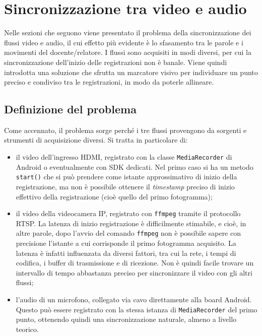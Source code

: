 \chapter{Sincronizzazione tra video e audio}
\label{cha:sync}

Nelle sezioni che seguono viene presentato il problema della sincronizzazione dei flussi video e audio, il cui effetto più evidente è lo sfasamento tra le parole e i movimenti del docente/relatore. I flussi sono acquisiti in modi diversi, per cui la sincronizzazione dell'inizio delle registrazioni non è banale. Viene quindi introdotta una soluzione che sfrutta un marcatore visivo per individuare un punto preciso e condiviso tra le registrazioni, in modo da poterle allineare.

\section{Definizione del problema}
\label{sec:sync_problema}

Come accennato, il problema sorge perché i tre flussi provengono da sorgenti e strumenti di acquisizione diversi. Si tratta in particolare di:

\begin{itemize}
	\item il video dell'ingresso HDMI, registrato con la classe \texttt{MediaRecorder} di Android o eventualmente con SDK dedicati. Nel primo caso si ha un metodo \texttt{start()} che si può prendere come istante approssimativo di inizio della registrazione, ma non è possibile ottenere il \emph{timestamp} preciso di inizio effettivo della registrazione (cioè quello del primo fotogramma);
	\item il video della videocamera IP, registrato con \texttt{ffmpeg} tramite il protocollo RTSP. La latenza di inizio registrazione è difficilmente stimabile, e cioè, in altre parole, dopo l'avvio del comando \texttt{ffmpeg} non è possibile sapere con precisione l'istante a cui corrisponde il primo fotogramma acquisito. La latenza è infatti influenzata da diversi fattori, tra cui la rete, i tempi di codifica, i buffer di trasmissione e di ricezione. Non è quindi facile trovare un intervallo di tempo abbastanza preciso per sincronizzare il video con gli altri flussi;
	\item l'audio di un microfono, collegato via cavo direttamente alla board Android. Questo può essere registrato con la stessa istanza di \texttt{MediaRecorder} del primo punto, ottenendo quindi una sincronizzazione naturale, almeno a livello teorico.
\end{itemize}

